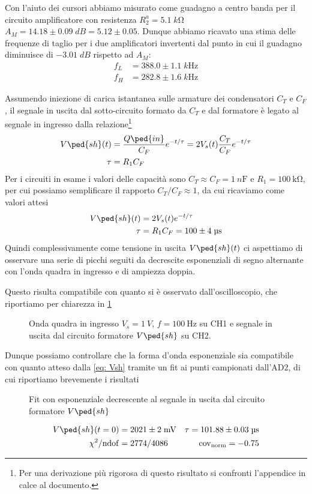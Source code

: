 \documentclass[10pt, a4paper, italian]{article}
\begin{document}
Con l'aiuto dei cursori abbiamo misurato come guadagno a centro banda
per il circuito amplificatore con resistenza $R_2^a = 5.1 \; \si{k\ohm}$
$A_M = 14.18 \pm 0.09 \; \si{dB} = 5.12 \pm 0.05$.
Dunque abbiamo ricavato una stima delle frequenze di taglio per i due
amplificatori invertenti dal punto in cui il guadagno diminuisce di
$-3.01 \; \si{dB}$ rispetto ad $A_M$:
\begin{align*}
f_L &= 388.0 \pm 1.1 \; \si{k\Hz} \\
f_H &= 282.8 \pm 1.6 \; \si{k\Hz}
\end{align*}

Assumendo iniezione di carica istantanea sulle armature dei condensatori $C_T$
e $C_F$, il segnale in uscita dal sotto-circuito formato da $C_T$ e dal
formatore è legato al segnale in ingresso dalla relazione\footnote{Per una
derivazione più rigorosa di questo risultato si confronti l'appendice
in calce al documento.}
\begin{align}\label{eq: Vsh}
V\ped{sh}(t) &= \frac{Q\ped{in}}{C_F} e^{-t/\tau} =
2V_s(t) \frac{C_T}{C_F} e^{-t/\tau} \\
\tau &= R_1 C_F
\end{align}
Per i circuiti in esame i valori delle capacità sono
$C_T \approx C_F = \SI{1}{n\F}$ e $R_1 = \SI{100}{\kilo\ohm}$,
per cui possiamo semplificare il rapporto $C_T/C_F \approx 1$, da cui
ricaviamo come valori attesi
\begin{align*}
V\ped{sh}(t) &= 2V_s(t) e^{-t/\tau} \\
\tau &= R_1 C_F = 100 \pm 4 \; \si{\micro\s}
\end{align*}
Quindi complessivamente come tensione in uscita $V\ped{sh} (t)$ ci aspettiamo
di osservare una serie di picchi seguiti da decrescite esponenziali di segno
alternante con l'onda quadra in ingresso e di ampiezza doppia.

Questo risulta compatibile con quanto si è osservato dall'oscilloscopio, che
riportiamo per chiarezza in \cref{fig: shaper}
\begin{figure}[htbp]
    \centering
    \caption{Onda quadra in ingresso $V_s = \SI{1}{V}$, $f = \SI{100}{\Hz}$
    su CH1 e segnale in uscita dal circuito formatore $V\ped{sh}$ su CH2.
    \label{fig: shaper}}
\end{figure}

Dunque possiamo controllare che la forma d'onda esponenziale sia compatibile
con quanto atteso dalla \eqref{eq: Vsh} tramite un fit ai punti campionati
dall'AD2, di cui riportiamo brevemente i risultati
\begin{figure}[htbp]
    \centering
    \caption{Fit con esponenziale decrescente al segnale in uscita dal
    circuito formatore $V\ped{sh}$ \label{fig: tau}}
\end{figure}
\begin{align*}
V\ped{sh} (t=0) &= 2021 \pm 2 \; \si{m\V}
&\tau = 101.88 \pm 0.03 \; \si{\micro\s} \\
\chi^2/\mathrm{ndof} &= 2774/4086 &\mathrm{cov_{norm}} = -0.75
\end{align*}
\end{document}
